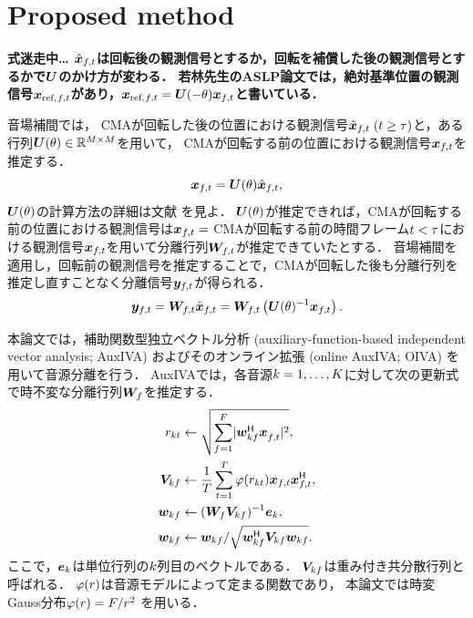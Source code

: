 \documentclass[twocolumn,9pt,dvipdfmx]{article}
\begin{document}
\section{Proposed method}
{%
  \color{red}\bf
  式迷走中… $\rotObs _{\ft}$は回転後の観測信号とするか，回転を補償した後の観測信号とするかで$\bm{U}$のかけ方が変わる．
  若林先生のASLP論文では，絶対基準位置の観測信号$\refObs _{\ft}$があり，$\refObs _{\ft} = \rotMat (-\rotDeg) \Obs _{\ft}$と書いている．
}

音場補間では，
CMAが回転した後の位置における観測信号$\rotObs _{\ft}\; (\tframe \geq \rotFra)$と，ある行列$\bm{U} (\theta) \in \mathbb{R} ^{M\times M}$を用いて，
CMAが回転する前の位置における観測信号$\Obs _{\ft}$を推定する．
\begin{equation}
  \Obs _{\ft} = \rotMat (\rotDeg) \rotObs _{\ft},
\end{equation}
$\bm{U} (\theta)$の計算方法の詳細は文献 \cite{Wakabayashi:2020:ASJ:A} を見よ．
$\bm{U} (\theta)$が推定できれば，CMAが回転する前の位置における観測信号は$\Obs _{\ft} = $
CMAが回転する前の時間フレーム$t < \tau$における観測信号$\Obs _{\ft}$を用いて分離行列$\Demix _{\ft}$が推定できていたとする．
音場補間を適用し，回転前の観測信号を推定することで，CMAが回転した後も分離行列を推定し直すことなく分離信号$\Est _{\ft}$が得られる．
\begin{equation}
  \Est _{\ft} = \Demix _{\ft} \rotObs _{\ft} = \Demix _{\ft} \left(\rotMat (\rotDeg)^{-1} \Obs _{\ft}\right).
\end{equation}

本論文では，補助関数型独立ベクトル分析 (auxiliary-function-based independent vector analysis; AuxIVA) \cite{Ono:2011:WASPAA}
およびそのオンライン拡張 (online AuxIVA; OIVA) \cite{Taniguchi:2014:HSCMA} を用いて音源分離を行う．
AuxIVAでは，各音源$k = 1, \dots, K$に対して次の更新式で時不変な分離行列$\bm{W} _{f}$を推定する．
\begin{align}
  \var _{\src\tframe} &\gets \sqrt{\sum _{\freq=1} ^{\Freq} \lvert \demix ^{\hermite} _{\src\freq} \Obs ^{\nohermite}_{\ft} \rvert ^2}, \\
  \cov _{\src\freq} &\gets \frac{1}{\Tframe} \sum _{\tframe=1} ^{\Tframe} \weight (\var_{\src\tframe}) \Obs _{\ft} \Obs _{\ft}^{\hermite}, \\
  \demix _{\src\freq} &\gets (\Demix _{\freq} \cov _{\src\freq}) ^{-1} \bm{e} _{\src} \label{eq:ip:proj}, \\
  \demix _{\src\freq} &\gets {\demix _{\src\freq}} / {\sqrt{\demix _{\src\freq} ^{\hermite} \cov _{\src\freq} \demix _{\src\freq}}} \label{eq:ip:norm}.
\end{align}
ここで，$\bm{e}_{k}$は単位行列の$k$列目のベクトルである．
$\bm{V} _{kf}$は{重み付き共分散行列}と呼ばれる．
$\varphi(r)$は音源モデルによって定まる関数であり，
本論文では時変Gauss分布$\varphi (r) = F/{r ^2}$ \cite{Ono:2012:APSIPA}を用いる．
\end{document}
